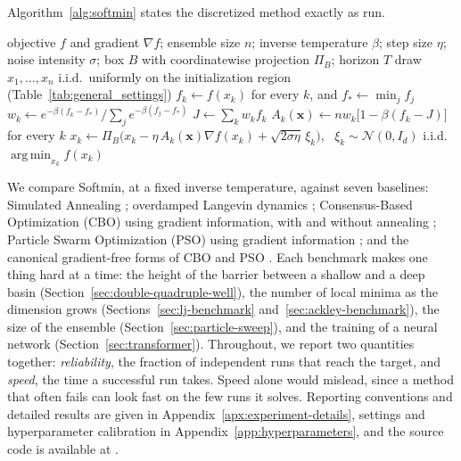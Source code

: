 \documentclass{article}
\theoremstyle{plain}
\theoremstyle{definition}
\theoremstyle{remark}
\newcommand{\prefactor}[2]{A_{#1}(#2)}
\DeclareMathOperator*{\argmin}{arg\,min}
\newcommand{\xx}{\mathbf{x}}
\begin{document}
Algorithm~\ref{alg:softmin} states the discretized method exactly as run.

\begin{algorithm}[!htbp]
\caption{Softmin energy dynamics: Euler--Maruyama discretization of \eqref{e:sde}.}
\label{alg:softmin}
\begin{algorithmic}[1]
\Require objective $f$ and gradient $\nabla f$; ensemble size $n$; inverse temperature $\beta$; step size $\eta$; noise intensity $\sigma$; box $B$ with coordinatewise projection $\Pi_B$; horizon $T$
\State draw $x_1,\dots,x_n$ i.i.d.\ uniformly on the initialization region (Table~\ref{tab:general_settings})
    \State $f_k\gets f(x_k)$ for every $k$, and $f_\ast\gets\min_j f_j$
    \State $w_k\gets e^{-\beta(f_k-f_\ast)}\bigl/\sum_{j}e^{-\beta(f_j-f_\ast)}$ 
    \State $J\gets\sum_k w_kf_k$ 
    \State $\prefactor{k}{\xx}\gets nw_k\bigl[1-\beta(f_k-J)\bigr]$ for every $k$ 
    \State $x_k\gets\Pi_B\bigl(x_k-\eta\,\prefactor{k}{\xx}\nabla f(x_k)+\sqrt{2\sigma\eta}\,\xi_k\bigr)$, \ $\xi_k\sim\mathcal{N}(0,I_d)$ i.i.d.
\EndFor
\State \Return $\argmin_{x_k}f(x_k)$
\end{algorithmic}
\end{algorithm}

We compare Softmin, at a fixed inverse temperature, against seven baselines: Simulated Annealing
\cite{gelfand1990sampling}; overdamped Langevin dynamics \cite{welling2011bayesian};
Consensus-Based Optimization (CBO) using gradient information, with and without annealing
\cite{carrillo2021consensus}; Particle Swarm Optimization (PSO) using gradient information
\cite{noel2012new}; and the canonical gradient-free forms of CBO
\cite{CarrilloChoiTotzeckTse2018, pinnau2017consensus} and PSO \cite{kennedy1995particle}. Each
benchmark makes one thing hard at a time: the height of the barrier between a shallow and a deep
basin (Section~\ref{sec:double-quadruple-well}), the number of local minima as the dimension grows
(Sections~\ref{sec:lj-benchmark} and~\ref{sec:ackley-benchmark}), the size of the ensemble
(Section~\ref{sec:particle-sweep}), and the training of a neural network
(Section~\ref{sec:transformer}). Throughout, we report two quantities together: \emph{reliability},
the fraction of independent runs that reach the target, and \emph{speed}, the time a successful run
takes. Speed alone would mislead, since a method that often fails can look fast on the few runs it
solves. Reporting conventions and detailed results are given in
Appendix~\ref{apx:experiment-details}, settings and hyperparameter calibration in
Appendix~\ref{app:hyperparameters}, and the source code is available at
\cite{softmin_energy_2026}.
\end{document}
